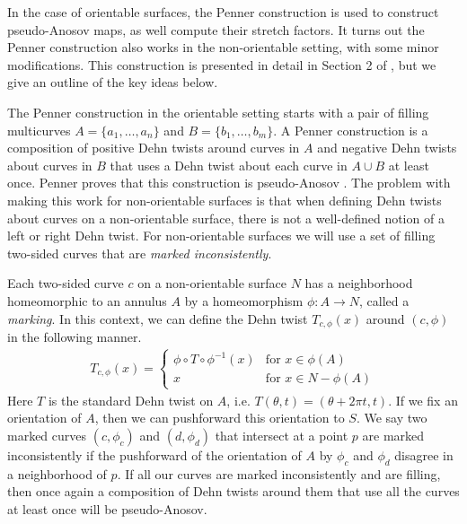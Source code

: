 
In the case of orientable surfaces, the Penner construction is used to construct pseudo-Anosov maps, as well compute their stretch factors. It turns out the Penner construction also works in the non-orientable setting, with some minor modifications. This construction is presented in detail in Section 2 of \cite{Strenner_2017}, but we give an outline of the key ideas below.

 The Penner construction in the orientable setting starts with a pair of filling multicurves $A = \{a_1,\dots,a_n\}$
and $B = \{b_1,\dots,b_m\}$.  A Penner construction is a composition of positive Dehn twists around curves in $A$ and negative Dehn twists about curves in $B$ that uses a Dehn twist about each curve in $A\cup B$ at least once.  Penner proves that this construction is pseudo-Anosov \cite{penner1988construction}. The problem with making this work for
non-orientable surfaces is that when defining Dehn twists about curves on a non-orientable surface, there is not a well-defined notion of a left or right Dehn twist. For non-orientable surfaces we will use a set of filling two-sided curves that are \textit{marked inconsistently}.

Each two-sided curve $c$ on a non-orientable surface $N$ has a neighborhood homeomorphic to an
annulus $A$ by a homeomorphism $\phi: A \xrightarrow{} N$, called a \textit{marking}. In this
context, we can define the Dehn twist $T_{c,\phi}(x)$ around $(c,\phi)$ in the following manner.
\begin{align*}
  T_{c,\phi}(x) =
  \begin{cases}
    \phi \circ T \circ \phi^{-1}(x) & \text{for } x \in \phi(A) \\
    x & \text{for } x \in N - \phi(A)
  \end{cases}
\end{align*}
Here $T$ is the standard Dehn twist on $A$, i.e. $T(\theta,t) = (\theta + 2\pi t,t)$. If we fix an
orientation of $A$, then we can pushforward this orientation to $S$. We say two marked curves
$(c,\phi_c)$ and $(d,\phi_d)$ that intersect at a point $p$ are marked inconsistently if the
pushforward of the orientation of $A$ by $\phi_c$ and $\phi_d$ disagree in a neighborhood of $p$.
If all our curves are marked inconsistently and are filling, then once again a composition of Dehn
twists around them that use all the curves at least once will be pseudo-Anosov.

